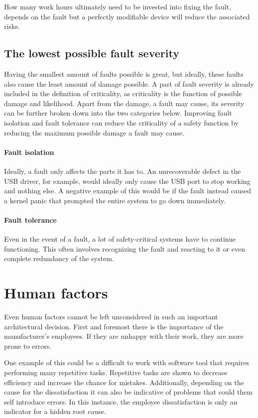How many work hours ultimately need to be invested into fixing the fault, depends on the fault but a perfectly modifiable device will reduce the associated risks.
\subsection{The lowest possible fault severity}
Having the smallest amount of faults possible is great, but ideally, these faults also cause the least amount of damage possible. A part of fault severity is already included in the definition of criticality, as criticality is the function of possible damage and likelihood. Apart from the damage, a fault may cause, its severity can be further broken down into the two categories below. Improving fault isolation and fault tolerance can reduce the criticality of a safety function by reducing the maximum possible damage a fault may cause.

\paragraph{Fault isolation}
Ideally,  a fault only affects the parts it has to. An unrecoverable defect in the USB driver, for example, would ideally only cause the USB port to stop working and nothing else. A negative example of this would be if the fault instead caused a kernel panic that prompted the entire system to go down immediately.
\paragraph{Fault tolerance}
Even in the event of a fault, a lot of safety-critical systems have to continue functioning. This often involves recognizing the fault and reacting to it or even complete redundancy of the system.

\section{Human factors}
Even human factors cannot be left unconsidered in such an important architectural decision. First and foremost there is the importance of the manufacturer's employees. If they are unhappy with their work, they are more prone to errors.

One example of this could be a difficult to work with software tool that requires performing many repetitive tasks. Repetitive tasks are shown to decrease efficiency and increase the chance for mistakes. Additionally, depending on the cause for the dissatisfaction it can also be indicative of problems that could them self introduce errors. In this instance, the employee dissatisfaction is only an indicator for a hidden root cause.

